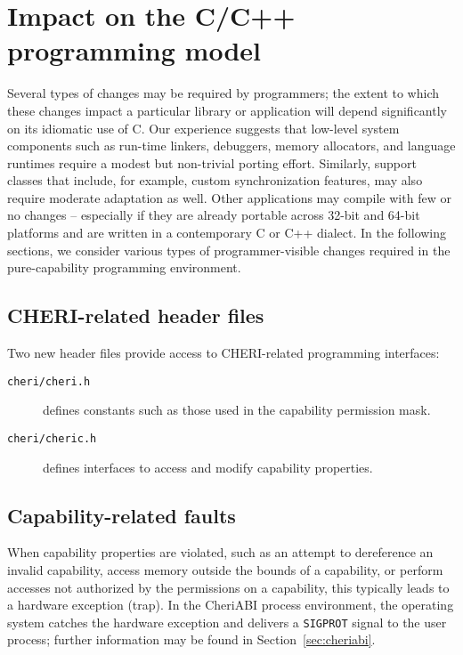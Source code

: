 \documentclass[11pt]{article}
\newcommand{\ccode}[1]{\lstinline[language={C},basicstyle=\small\ttfamily]{#1}}
\begin{document}
\section{Impact on the C/C++ programming model}

Several types of changes may be required by programmers; the extent to which
these changes impact a particular library or application will depend
significantly on its idiomatic use of C.
Our experience suggests that low-level system components such as run-time
linkers, debuggers, memory allocators, and language runtimes require a modest
but non-trivial porting effort.
Similarly, support classes that include, for example, custom synchronization
features, may also require moderate adaptation as well.
Other applications may compile with few or no changes -- especially if they
are already portable across 32-bit and 64-bit platforms and are written in a contemporary C or C++ dialect.
In the following sections, we consider various types of programmer-visible
changes required in the pure-capability programming environment.

\subsection{CHERI-related header files}

Two new header files provide access to CHERI-related programming interfaces:

\begin{description}
\item[\texttt{cheri/cheri.h}] defines constants such as those used in the
  capability permission mask.

\item[\texttt{cheri/cheric.h}] defines interfaces to access and
  modify capability properties.
\end{description}

\subsection{Capability-related faults}
\label{sec:faults}

When capability properties are violated, such as an attempt to dereference an
invalid capability, access memory outside the bounds of a capability, or perform
accesses not authorized by the permissions on a capability, this typically
leads to a hardware exception (trap).
In the CheriABI process environment, the operating system catches the hardware
exception and delivers a \ccode{SIGPROT} signal to the user process;
further information may be found in Section~\ref{sec:cheriabi}.
\end{document}
